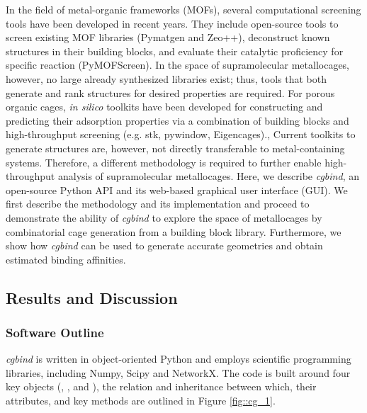 \documentclass[../../main.tex]{subfiles}
\newcommand{\cgbind}{\emph{cgbind }}
\begin{document}
In the field of metal-organic frameworks (MOFs), several computational screening tools have been developed in recent years.\cite{Wilmer2012, Simon2015} They include open-source tools to screen existing MOF libraries (Pymatgen\cite{Ong2013} and Zeo++\cite{Willems2012}), deconstruct known structures in their building blocks,\cite{Bucior2019} and evaluate their catalytic proficiency for specific reaction (PyMOFScreen\cite{Rosen2019}). In the space of supramolecular metallocages, however, no large already synthesized libraries exist; thus, tools that both generate and rank structures for desired properties are required. For porous organic cages, \emph{in silico} toolkits have been developed for constructing and predicting their adsorption properties via a combination of building blocks and high-throughput screening (e.g. stk, pywindow, Eigencages).\cite{Greenaway2018, Miklitz2017, Turcani2018, Sturluson2018, Kravchenko2020, Miklitz2018}, Current toolkits to generate structures are, however, not directly transferable to metal-containing systems. Therefore, a different methodology is required to further enable high-throughput analysis of supramolecular metallocages.
Here, we describe \emph{cgbind}, an open-source Python API and its web-based graphical user interface (GUI). We first describe the methodology and its implementation and proceed to demonstrate the ability of \cgbind to explore the space of metallocages by combinatorial cage generation from a building block library. Furthermore, we show how \cgbind can be used to generate accurate geometries and obtain estimated binding affinities.



\subsection{Results and Discussion}

\subsubsection{Software Outline}

 \cgbind is written in object-oriented Python and employs scientific programming libraries, including Numpy, Scipy and NetworkX.\cite{Numpy, SciPy} The code is built around four key objects (, ,  and ), the relation and inheritance between which, their attributes, and key methods are outlined in Figure \ref{fig::cg_1}. 
\end{document}
